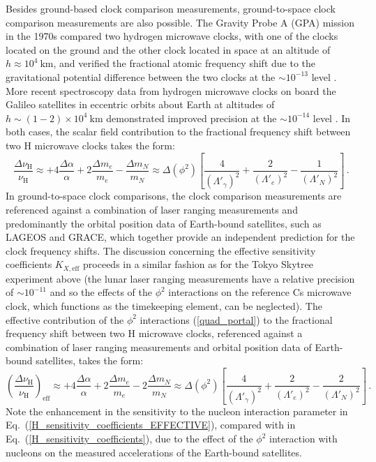 \documentclass[aps,prd,onecolumn,nofootinbib]{revtex4-2} %
\begin{document}
Besides ground-based clock comparison measurements, ground-to-space clock comparison measurements are also possible. 
The Gravity Probe A (GPA) mission in the 1970s compared two hydrogen microwave clocks, with one of the clocks located on the ground and the other clock located in space at an altitude of $h \approx 10^4~\textrm{km}$, and verified the fractional atomic frequency shift due to the gravitational potential difference between the two clocks at the $\sim 10^{-13}$ level \cite{GPA_H-maser_1980,GPA_H-maser_1979,GPA_H-maser_1989}. 
More recent spectroscopy data from hydrogen microwave clocks on board the Galileo satellites in eccentric orbits about Earth at altitudes of $h \sim (1 - 2) \times 10^4~\textrm{km}$ demonstrated improved precision at the $\sim 10^{-14}$ level \cite{Eccentric_Galileo_2018A,Eccentric_Galileo_2018B}. 
In both cases, the scalar field contribution to the fractional frequency shift between two H microwave clocks takes the form: 
\begin{equation}
\label{H_sensitivity_coefficients}
\frac{\Delta \nu_\textrm{H}}{\nu_\textrm{H}} \approx + 4 \frac{\Delta \alpha}{\alpha} + 2 \frac{\Delta m_e}{m_e} - \frac{\Delta m_N}{m_N} \approx \Delta(\phi^2) \left[ \frac{4}{\left( \Lambda'_\gamma \right)^2} + \frac{2}{\left( \Lambda'_e \right)^2} - \frac{1}{\left( \Lambda'_N \right)^2} \right]  \, . 
\end{equation}
In ground-to-space clock comparisons, the clock comparison measurements are referenced against a combination of laser ranging measurements %
and predominantly the orbital position data of Earth-bound satellites, such as LAGEOS and GRACE, which together provide an independent prediction for the clock frequency shifts. 
The discussion concerning the effective sensitivity coefficients $K_{X,\textrm{eff}}$ proceeds in a similar fashion as for the Tokyo Skytree experiment above (the lunar laser ranging measurements have a relative precision of $\sim 10^{-11}$ and so the effects of the $\phi^2$ interactions on the reference Cs microwave clock, which functions as the timekeeping element, can be neglected). 
The effective contribution of the $\phi^2$ interactions (\ref{quad_portal}) to the fractional frequency shift between two H microwave clocks, referenced against a combination of laser ranging measurements and orbital position data of Earth-bound satellites, takes the form: 
\begin{equation}
\label{H_sensitivity_coefficients_EFFECTIVE}
\left( \frac{\Delta \nu_\textrm{H}}{\nu_\textrm{H}} \right)_\textrm{eff} \approx + 4 \frac{\Delta \alpha}{\alpha} + 2 \frac{\Delta m_e}{m_e} - 2 \frac{\Delta m_N}{m_N} \approx \Delta(\phi^2) \left[ \frac{4}{\left( \Lambda'_\gamma \right)^2} + \frac{2}{\left( \Lambda'_e \right)^2} - \frac{2}{\left( \Lambda'_N \right)^2} \right]  \, . 
\end{equation}
Note the enhancement in the sensitivity to the nucleon interaction parameter in Eq.~(\ref{H_sensitivity_coefficients_EFFECTIVE}), compared with in Eq.~(\ref{H_sensitivity_coefficients}), due to the effect of the $\phi^2$ interaction with nucleons on the measured accelerations of the Earth-bound satellites. 
\end{document}
